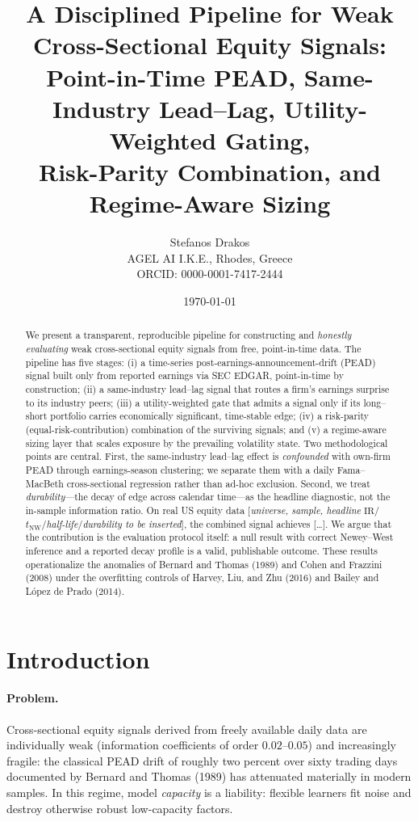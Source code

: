 \documentclass[11pt,a4paper]{article}
\title{\textbf{A Disciplined Pipeline for Weak Cross-Sectional Equity Signals:\\
Point-in-Time PEAD, Same-Industry Lead--Lag, Utility-Weighted Gating,\\
Risk-Parity Combination, and Regime-Aware Sizing}}
\author{Stefanos Drakos\\
\small AGEL AI I.K.E., Rhodes, Greece\\
\small ORCID: 0000-0001-7417-2444}
\date{\today}
\theoremstyle{plain}
\theoremstyle{definition}
\newcommand{\IR}{\mathrm{IR}}
\begin{document}
\maketitle

\begin{abstract}
We present a transparent, reproducible pipeline for constructing and \emph{honestly evaluating}
weak cross-sectional equity signals from free, point-in-time data. The pipeline has five stages:
(i) a time-series post-earnings-announcement-drift (PEAD) signal built only from reported earnings
via SEC EDGAR, point-in-time by construction; (ii) a same-industry lead--lag signal that routes a
firm's earnings surprise to its industry peers; (iii) a utility-weighted gate that admits a signal
only if its long--short portfolio carries economically significant, time-stable edge; (iv) a
risk-parity (equal-risk-contribution) combination of the surviving signals; and (v) a
regime-aware sizing layer that scales exposure by the prevailing volatility state. Two
methodological points are central. First, the same-industry lead--lag effect is \emph{confounded}
with own-firm PEAD through earnings-season clustering; we separate them with a daily
Fama--MacBeth cross-sectional regression rather than ad-hoc exclusion. Second, we treat
\emph{durability}---the decay of edge across calendar time---as the headline diagnostic, not the
in-sample information ratio. On real US equity data
[\emph{universe, sample, headline} $\IR$/$t_{\mathrm{NW}}$/\emph{half-life}/\emph{durability to be inserted}], the
combined signal achieves [\ldots]. We argue that the contribution is the evaluation protocol
itself: a null result with correct Newey--West inference and a reported decay profile is a valid,
publishable outcome. These results operationalize the anomalies of Bernard and Thomas (1989) and
Cohen and Frazzini (2008) under the overfitting controls of Harvey, Liu, and Zhu (2016) and Bailey
and L\'opez de Prado (2014).
\end{abstract}

\section{Introduction}
\label{sec:intro}

\paragraph{Problem.} Cross-sectional equity signals derived from freely available daily data are
individually weak (information coefficients of order $0.02$--$0.05$) and increasingly fragile: the
classical PEAD drift of roughly two percent over sixty trading days documented by Bernard and
Thomas (1989) has attenuated materially in modern samples. In this regime, model \emph{capacity}
is a liability: flexible learners fit noise and destroy otherwise robust low-capacity factors.
\end{document}
